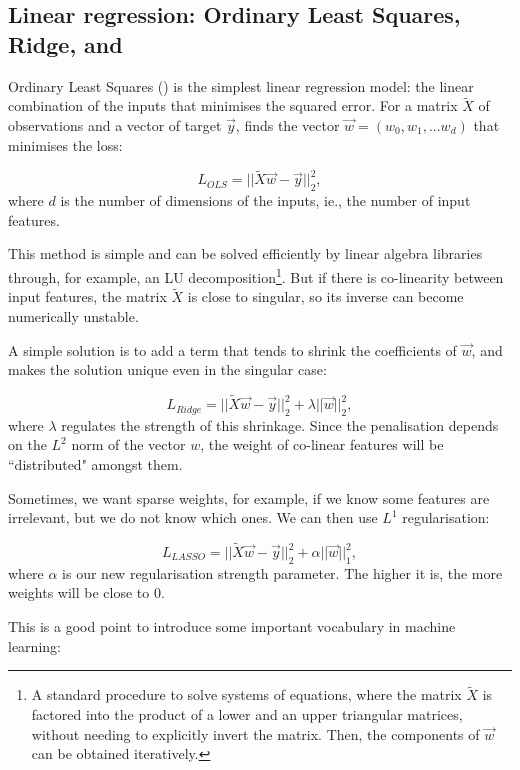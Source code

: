 \subsection[Linear regression]{Linear regression: Ordinary Least Squares, Ridge, and \LASSO}\label{sec:linear}
Ordinary Least Squares (\OLS) is the simplest linear regression model: the linear combination of the inputs that minimises the squared error.
For a matrix $ \widetilde X$ of observations and a vector of target $\vec y$, \OLS{} finds the vector $\vec w = (w_0, w_1, ... w_d)$ that minimises the loss:

\begin{equation*}
 L_{OLS} = || \widetilde  X \vec w - \vec y ||_2 ^2,
\end{equation*}
where $d$ is the number of dimensions of the inputs, ie., the number of input features.

This method is simple and can be solved efficiently by linear algebra libraries through, for example, an LU decomposition\footnote{A standard procedure to solve systems of equations, where the matrix $\widetilde{X}$ is factored into the product of a lower and an upper triangular matrices, without needing to explicitly invert the matrix. Then, the components of $\vec w$ can be obtained iteratively.}.
But if there is co-linearity between input features, the matrix $ \widetilde X$ is close to singular, so its inverse can become numerically unstable.

A simple solution  is to add a term that tends to shrink the coefficients of $\vec w$, and makes the solution unique even in the singular case:

\[ L_{Ridge} = || \widetilde  X \vec w - \vec y ||_2 ^2 + \lambda ||\vec w||_2^2,\]
where $\lambda$ regulates the strength of this shrinkage.
Since the penalisation depends on the $L^2$ norm of the vector $w$, the weight of co-linear features will be ``distributed" amongst them.

Sometimes, we want sparse weights, \marginpar{\LASSO} for example, if we know some features are irrelevant, but we do not know which ones.
We can then use $L^1$ regularisation:

\[ L_{LASSO} = || \widetilde X \vec w - \vec y ||_2 ^2 + \alpha ||\vec w||_1^2,\]
where $\alpha$ is our new regularisation strength parameter.
The higher it is, the more weights will be close to $0$.

This is a good point to introduce
some important vocabulary in machine learning:

